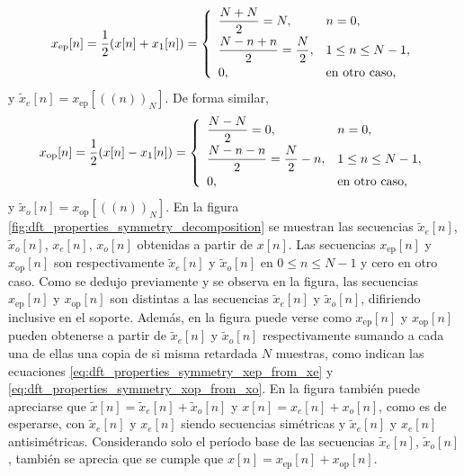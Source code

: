 \documentclass[a4paper]{report}
\begin{document}
\[
 x_\textrm{ep}[n]=\frac{1}{2}(x[n]+x_1[n])=
 \left\{ 
  \begin{array}{ll}
   \dfrac{N+N}{2}=N, & n=0,\\[\medskipamount]
   \dfrac{N-n+n}{2}=\dfrac{N}{2}, & 1\leq n\leq N-1,\\[\medskipamount]
   0, & \textrm{en otro caso,}
  \end{array}
 \right. 
\]
y \(\tilde{x}_e[n]=x_\textrm{ep}[((n))_N]\). De forma similar,
\[
 x_\textrm{op}[n]=\frac{1}{2}(x[n]-x_1[n])=
 \left\{ 
  \begin{array}{ll}
   \dfrac{N-N}{2}=0, & n=0,\\[\medskipamount]
   \dfrac{N-n-n}{2}=\dfrac{N}{2}-n, & 1\leq n\leq N-1,\\[\medskipamount]
   0, & \textrm{en otro caso,}
  \end{array}
 \right. 
\]
y \(\tilde{x}_o[n]=x_\textrm{op}[((n))_N]\). En la figura \ref{fig:dft_properties_symmetry_decomposition} se muestran las secuencias \(\tilde{x}_e[n]\), \(\tilde{x}_o[n]\), \(x_e[n]\), \(x_o[n]\) obtenidas a partir de \(x[n]\). Las secuencias \(x_\textrm{ep}[n]\) y \(x_\textrm{op}[n]\) son respectivamente \(\tilde{x}_e[n]\) y \(\tilde{x}_o[n]\) en \(0\leq n\leq N-1\) y cero en otro caso. Como se dedujo previamente y se observa en la figura, las secuencias \(x_\textrm{ep}[n]\) y \(x_\textrm{op}[n]\) son distintas a las secuencias \(\tilde{x}_e[n]\) y \(\tilde{x}_o[n]\), difiriendo inclusive en el soporte. Además, en la figura puede verse como \(x_\textrm{ep}[n]\) y \(x_\textrm{op}[n]\) pueden obtenerse a partir de \(\tilde{x}_e[n]\) y \(\tilde{x}_o[n]\) respectivamente sumando a cada una de ellas una copia de si misma retardada \(N\) muestras, como indican las ecuaciones \ref{eq:dft_properties_symmetry_xep_from_xe} y \ref{eq:dft_properties_symmetry_xop_from_xo}. En la figura también puede apreciarse que \(\tilde{x}[n]=\tilde{x}_e[n]+\tilde{x}_o[n]\) y \(x[n]=x_e[n]+x_o[n]\), como es de esperarse, con \(\tilde{x}_e[n]\) y \(x_e[n]\) siendo secuencias simétricas y \(\tilde{x}_e[n]\) y \(x_e[n]\) antisimétricas. Considerando solo el período base de las secuencias \(\tilde{x}_e[n]\), \(\tilde{x}_o[n]\), también se aprecia que se cumple que \(x[n]=x_\textrm{ep}[n]+x_\textrm{op}[n]\).
\end{document}
